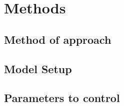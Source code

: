 \pagebreak
\section{Methods}
\label{ch:Methods}

\subsection{Method of approach}
\subsection{Model Setup}
\subsection{Parameters to control}
